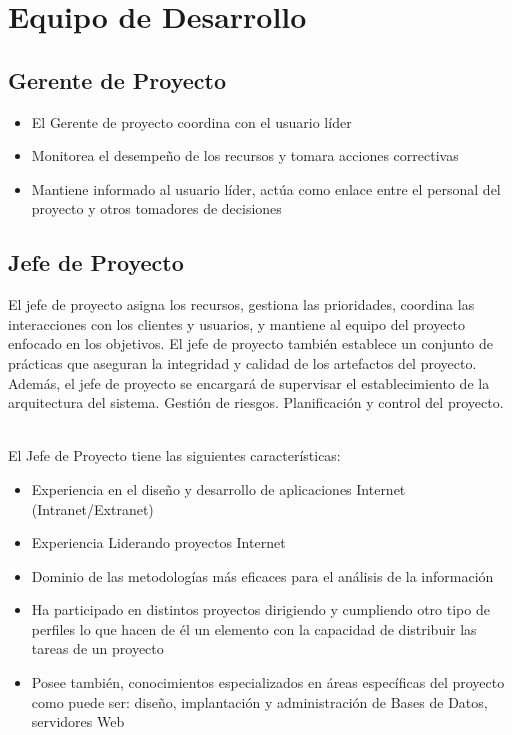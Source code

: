 \section{Equipo de Desarrollo}
	\subsection{Gerente de Proyecto}
		\begin{itemize}
			\item El Gerente de proyecto coordina con el usuario líder
			\item Monitorea el desempeño de los recursos y tomara acciones correctivas
			\item Mantiene informado al usuario líder, actúa como enlace entre el
			personal del proyecto y otros tomadores de decisiones
		\end{itemize}
		
	\subsection{Jefe de Proyecto}
		
		El jefe de proyecto asigna los recursos, gestiona las prioridades, coordina las
		interacciones con los clientes y usuarios, y mantiene al equipo del proyecto
		enfocado en los objetivos. El jefe de proyecto también establece un conjunto de
		prácticas que aseguran la integridad y calidad de los artefactos del proyecto.
		Además, el jefe de proyecto se encargará de supervisar el establecimiento de la
		arquitectura del sistema. Gestión de riesgos. Planificación y control del
		proyecto.\\\
		
		El Jefe de Proyecto tiene las siguientes características:
		
		\begin{itemize}
			\item Experiencia en el diseño y desarrollo de aplicaciones Internet
			(Intranet/Extranet)
			
			\item Experiencia Liderando proyectos Internet
			
			\item Dominio de las metodologías más eficaces para el análisis de la
			información
			
			\item Ha participado en distintos proyectos dirigiendo y cumpliendo otro
			tipo de perfiles lo que hacen de él un elemento con la capacidad de
			distribuir las tareas de un proyecto
			
			\item Posee también, conocimientos especializados en áreas específicas del
			proyecto como puede ser: diseño, implantación y administración de Bases de
			Datos, servidores Web
		\end{itemize}
	
